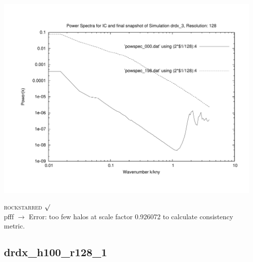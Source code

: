 \includegraphics[scale=0.5]{r128/drdx_3/plot_powspec_drdx_3.pdf}


\textsc{rockstarred} $\surd$  \\
pfff $\rightarrow$ Error: too few halos at scale factor 0.926072 to calculate consistency metric.

\newpage
\subsection{drdx\_h100\_r128\_1}

